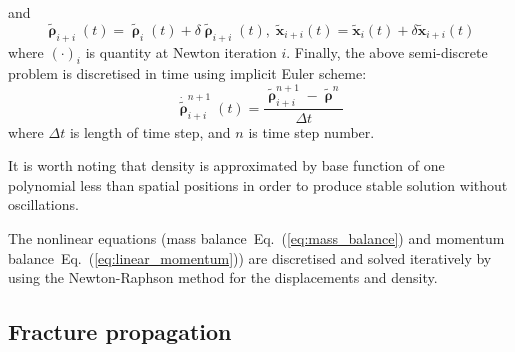 \documentclass[review]{elsarticle}
\numberwithin{equation}{section}
\begin{document}
and 
\begin{equation}
\tilde{\pmb\uprho}_{i+i}(t) =
\tilde{\pmb\uprho}_{i}(t) + \delta\tilde{\pmb\uprho}_{i+i}(t),\;
	\tilde{\mathbf{x}}_{i+i}(t) =
	\tilde{\mathbf{x}}_{i}(t) + \delta\tilde{\mathbf{x}}_{i+i}(t)
\end{equation}
where $(\cdot)_i$ is quantity at Newton iteration $i$. Finally, the
above semi-discrete problem is discretised in time using implicit Euler scheme:
\begin{equation}
	\dot{\tilde{\pmb\uprho}}_{i+i}^{n+1}(t) =
	\frac{
	\tilde{\pmb\uprho}_{i+i}^{n+1}-\tilde{\pmb\uprho}^{n}
	}{\Delta t}
\end{equation}
where $\Delta t$ is length of time step, and $n$ is time step number.

It is worth noting that density is approximated by base  function of one polynomial less than spatial positions in
order to produce stable solution without oscillations.

The nonlinear equations (mass
balance~Eq.~(\ref{eq:mass_balance}) and momentum
balance~Eq.~(\ref{eq:linear_momentum})) are discretised and solved iteratively by
using the Newton-Raphson method for the displacements and density.

%
%
\subsection{Fracture propagation} \label{sec:fem_fracture_prop}
\end{document}
